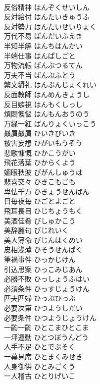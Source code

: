 \documentclass[8pt]{extreport}
\begin{document}
\begin{CJK}{UTF8}{min}
\\	反俗精神	はんぞくせいしん	
\\	反対給付	はんたいきゅうふ	
\\	反対勢力	はんたいせいりょく	
\\	万代不易	ばんだいふえき	
\\	半知半解	はんちはんかい	
\\	半端仕事	はんぱしごと	
\\	万物流転	ばんぶつるてん	
\\	万夫不当	ばんぷふとう	
\\	繁文縟礼	はんぶんじょくれい	
\\	反面教師	はんめんきょうし	
\\	反目嫉視	はんもくしっし	
\\	煩悶懊悩	はんもんおうのう	
\\	万緑一紅	ばんりょくいっこう	
\\	贔屓贔屓	ひいきびいき	
\\	被害妄想	ひがいもうそう	
\\	悲歌慷慨	ひかこうがい	
\\	飛花落葉	ひからくよう	
\\	媚眼秋波	びがんしゅうは	
\\	悲喜交々	ひきこもごも	
\\	卑怯千万	ひきょうせんばん	
\\	日毎夜毎	ひごとよごと	
\\	飛耳長目	ひじちょうもく	
\\	美酒佳肴	びしゅかこう	
\\	美辞麗句	びじれいく	
\\	美人薄命	びじんはくめい	
\\	皮相浅薄	ひそうせんぱく	
\\	筆禍事件	ひっかじけん	
\\	引込思案	ひっこみじあん	
\\	必勝不敗	ひっしょうふはい	
\\	必須条件	ひっすじょうけん	
\\	匹夫匹婦	ひっぷひっぷ	
\\	必要次第	ひつようしだい	
\\	必要条件	ひつようじょうけん	
\\	一齣一齣	ひとこまひとこま	
\\	一坪運動	ひとつぼうんどう	
\\	人手不足	ひとでぶそく	
\\	一幕見席	ひとまくみせき	
\\	人身御供	ひとみごくう	
\\	一人稽古	ひとりげいこ	

\end{CJK}
\end{document}
